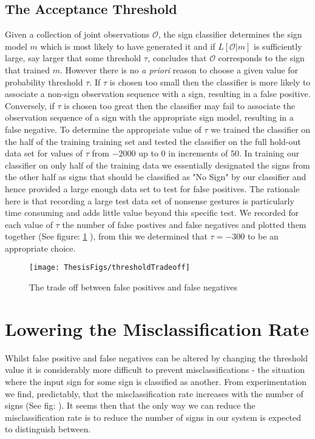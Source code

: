 \subsection{The Acceptance Threshold}
Given a collection of joint observations $\mathcal{O}$, the sign classifier determines the sign model $m$ which is most likely to have generated it and if $L[\mathcal{O}|m]$ is sufficiently large, say larger that some threshold $\tau$, concludes that $\mathcal{O}$ corresponds to the sign that trained $m$. However there is no \emph{a priori} reason to choose a given value for probability threshold $\tau$. If $\tau$ is chosen too small then the classifier is more likely to associate a non-sign observation sequence with a sign, resulting in a false positive. Conversely, if $\tau$ is chosen too great then the classifier may fail to associate the observation sequence of a sign with the appropriate sign model, resulting in a false negative. To determine the appropriate value of $\tau$ we trained the classifier on the half of the training training set and tested the classifier on the full hold-out data set for values of $\tau$ from $-2000$ up to $0$ in increments of $50$. In training our classifier on only half of the training data we essentially designated the signs from the other half as signs that should be classified as "No Sign" by our classifier and hence provided a large enough data set to test for false positives. The rationale here is that recording a large test data set of nonsense gestures is particularly time consuming and adds little value beyond this specific test. We recorded for each value of $\tau$ the number of false postives and false negatives and plotted them together (See figure: \ref{fig:misclassTest} ), from this we determined that $\tau = -300$ to be an appropriate choice. 


\begin{figure}[h!]
        \centering
        \texttt{[image: ThesisFigs/thresholdTradeoff]}
        \caption{The trade off between false positives and false negatives}\label{fig:misclassTest}
\end{figure}

\section{Lowering the Misclassification Rate}
Whilst false positive and false negatives can be altered by changing the threshold value it is considerably more difficult to prevent misclassifications - the situation where the input sign for some sign is classified as another. From experimentation we find, predictably, that the misclassification rate increases with the number of signs (See fig: ). It seems then that the only way we can reduce the misclassification rate is to reduce the number of signs in our system is expected to distinguish between.

